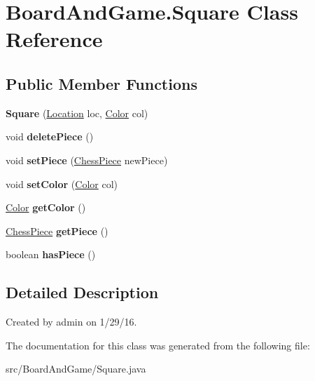 \hypertarget{class_board_and_game_1_1_square}{}\section{Board\+And\+Game.\+Square Class Reference}
\label{class_board_and_game_1_1_square}
\subsection*{Public Member Functions}
\begin{DoxyCompactItemize}
\item 
{\bfseries Square} (\hyperlink{class_chess_pieces_1_1_location}{Location} loc, \hyperlink{enum_chess_pieces_1_1_color}{Color} col)\hypertarget{class_board_and_game_1_1_square_a92a2aefbb8e9f1fc3d84bb84e3500c4a}{}\label{class_board_and_game_1_1_square_a92a2aefbb8e9f1fc3d84bb84e3500c4a}

\item 
void {\bfseries delete\+Piece} ()\hypertarget{class_board_and_game_1_1_square_a8c9a929e2f8f4f6f663ab37a15d61cd0}{}\label{class_board_and_game_1_1_square_a8c9a929e2f8f4f6f663ab37a15d61cd0}

\item 
void {\bfseries set\+Piece} (\hyperlink{class_chess_pieces_1_1_chess_piece}{Chess\+Piece} new\+Piece)\hypertarget{class_board_and_game_1_1_square_a7855ecbf83baff922e770feb6fcc5179}{}\label{class_board_and_game_1_1_square_a7855ecbf83baff922e770feb6fcc5179}

\item 
void {\bfseries set\+Color} (\hyperlink{enum_chess_pieces_1_1_color}{Color} col)\hypertarget{class_board_and_game_1_1_square_ae75a4148f6b31d3cf75693b142fab8e5}{}\label{class_board_and_game_1_1_square_ae75a4148f6b31d3cf75693b142fab8e5}

\item 
\hyperlink{enum_chess_pieces_1_1_color}{Color} {\bfseries get\+Color} ()\hypertarget{class_board_and_game_1_1_square_a2c18545b412082261de04e24afe927b1}{}\label{class_board_and_game_1_1_square_a2c18545b412082261de04e24afe927b1}

\item 
\hyperlink{class_chess_pieces_1_1_chess_piece}{Chess\+Piece} {\bfseries get\+Piece} ()\hypertarget{class_board_and_game_1_1_square_ac5a6c5410d50faba7650fa5f9db123c9}{}\label{class_board_and_game_1_1_square_ac5a6c5410d50faba7650fa5f9db123c9}

\item 
boolean {\bfseries has\+Piece} ()\hypertarget{class_board_and_game_1_1_square_a9491979b8d640082f8bcdcd5d1f1b270}{}\label{class_board_and_game_1_1_square_a9491979b8d640082f8bcdcd5d1f1b270}

\end{DoxyCompactItemize}


\subsection{Detailed Description}
Created by admin on 1/29/16. 

The documentation for this class was generated from the following file\+:\begin{DoxyCompactItemize}
\item 
src/\+Board\+And\+Game/Square.\+java\end{DoxyCompactItemize}
